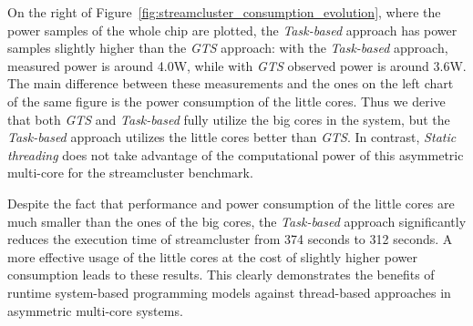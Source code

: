 On the right of Figure~\ref{fig:streamcluster_consumption_evolution}, where the power samples of the whole chip are plotted, the \emph{Task-based} approach has power samples slightly higher than the \emph{GTS} approach:
with the \emph{Task-based} approach, measured power is around 4.0W, while with \emph{GTS} observed power is around 3.6W.
The main difference between these measurements and the ones on the left chart of the same figure is the power consumption of the little cores. 
Thus we derive that both \emph{GTS} and \emph{Task-based} fully utilize the big cores in the system, but the \emph{Task-based} approach utilizes the little cores better than \emph{GTS}. In contrast, \emph{Static threading} does not take advantage of the computational power of this asymmetric multi-core for the streamcluster benchmark.

Despite the fact that performance and power consumption of the little cores are much smaller than the ones of the big cores, the \emph{Task-based} approach significantly reduces the execution time of streamcluster from 374 seconds to 312 seconds. A more effective usage of the little cores at the cost of slightly higher power consumption leads to these results. This clearly demonstrates the benefits of runtime system-based programming models against thread-based approaches in asymmetric multi-core systems.





